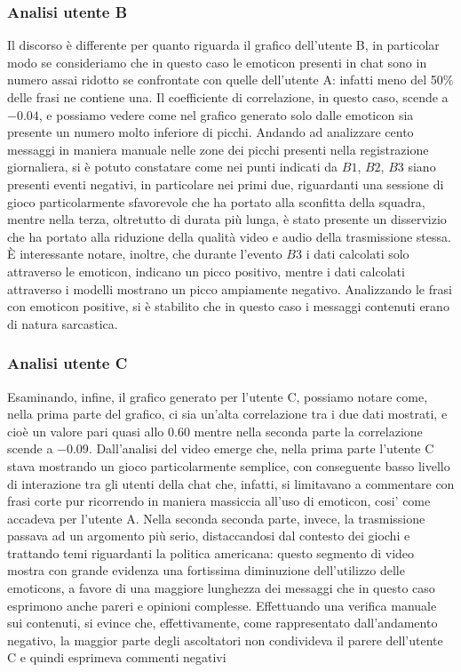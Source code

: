 \documentclass[a4paper,12pt,openright,twoside]{report}
\theoremstyle{definition}
\begin{document}
\subsubsection{Analisi utente B}
Il discorso è differente per quanto riguarda il grafico dell'utente B, in particolar
modo se consideriamo che in questo caso le emoticon presenti in chat
sono in numero assai ridotto se confrontate con quelle dell'utente A:
infatti meno del 50\%
delle frasi ne contiene una. Il coefficiente di correlazione, in questo caso, scende a $-0.04$, e possiamo vedere come
nel grafico generato solo dalle emoticon sia presente un numero molto inferiore di picchi.
Andando ad analizzare cento messaggi in maniera manuale nelle zone dei picchi presenti nella registrazione giornaliera, si è potuto constatare come nei punti indicati da
$B1$, $B2$, $B3$ siano presenti eventi negativi, in particolare nei primi due, riguardanti una sessione di gioco
particolarmente sfavorevole che ha portato alla sconfitta della squadra, mentre nella terza, oltretutto di durata
più lunga, è stato presente un disservizio che ha portato alla riduzione della qualità video e audio della 
trasmissione stessa.
\`E interessante notare, inoltre, che durante l'evento $B3$ i dati calcolati solo attraverso le emoticon, indicano
un picco positivo, mentre i dati calcolati attraverso i modelli mostrano un picco ampiamente negativo. Analizzando
le frasi con emoticon positive, si è stabilito che in questo caso i messaggi contenuti erano di natura sarcastica.

\subsubsection{Analisi utente C}
Esaminando, infine, il grafico generato per l'utente C, possiamo notare come, nella prima
parte del grafico, ci sia un'alta correlazione tra i due dati mostrati,
e cioè un valore pari quasi allo $0.60$ mentre nella
seconda parte la correlazione scende a $-0.09$. 
Dall'analisi del video emerge che, nella prima parte l'utente C
stava mostrando un gioco particolarmente semplice, con conseguente basso livello di interazione tra gli utenti
della chat che, infatti, si limitavano a commentare con frasi corte
pur ricorrendo in maniera massiccia all'uso di emoticon, cosi' 
come accadeva per l'utente A. 
Nella seconda seconda parte, invece, la trasmissione passava ad un argomento più serio,
distaccandosi dal contesto dei giochi e trattando temi riguardanti la politica americana:
questo segmento di video mostra con grande evidenza una fortissima diminuzione dell'utilizzo
delle emoticons, a favore di una maggiore lunghezza dei messaggi che in questo caso
esprimono anche pareri e opinioni complesse. 
Effettuando una verifica manuale sui contenuti,
si evince che, effettivamente, come rappresentato dall'andamento negativo, la maggior parte degli ascoltatori
non condivideva il parere dell'utente C e quindi esprimeva commenti negativi
\end{document}
